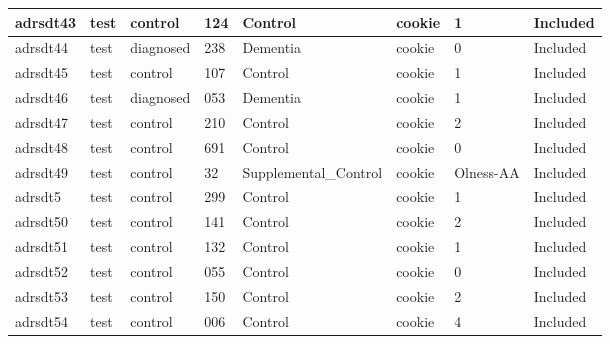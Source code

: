 \begin{center}
\begin{longtable}{|l|l|l|l|l|l|l|l|}
adrsdt43       & test                  & control           & 124                & Control              & cookie          & 1                & Included      \\ \hline
adrsdt44       & test                  & diagnosed         & 238                & Dementia             & cookie          & 0                & Included      \\ \hline
adrsdt45       & test                  & control           & 107                & Control              & cookie          & 1                & Included      \\ \hline
adrsdt46       & test                  & diagnosed         & 053                & Dementia             & cookie          & 1                & Included      \\ \hline
adrsdt47       & test                  & control           & 210                & Control              & cookie          & 2                & Included      \\ \hline
adrsdt48       & test                  & control           & 691                & Control              & cookie          & 0                & Included      \\ \hline
adrsdt49       & test                  & control           & 32                 & Supplemental\_Control & cookie          & Olness-AA        & Included      \\ \hline
adrsdt5        & test                  & control           & 299                & Control              & cookie          & 1                & Included      \\ \hline
adrsdt50       & test                  & control           & 141                & Control              & cookie          & 2                & Included      \\ \hline
adrsdt51       & test                  & control           & 132                & Control              & cookie          & 1                & Included      \\ \hline
adrsdt52       & test                  & control           & 055                & Control              & cookie          & 0                & Included      \\ \hline
adrsdt53       & test                  & control           & 150                & Control              & cookie          & 2                & Included      \\ \hline
adrsdt54       & test                  & control           & 006                & Control              & cookie          & 4                & Included      \\ \hline

\end{longtable}
\end{center}
